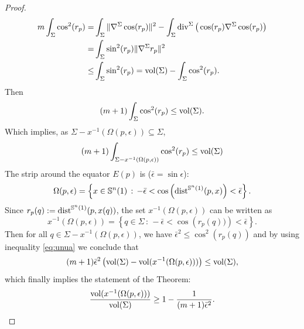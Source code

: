\documentclass{amsart}
\theoremstyle{definition}
\theoremstyle{remark}
\newcommand{\Div}{\operatorname{div}}
\begin{document}
\begin{proof}
\begin{equation}\label{eq:longa}
    \begin{aligned}
m\int_\Sigma\cos^2(r_p)=&\int_\Sigma\Vert \nabla^{\Sigma}  \cos(r_p)\Vert^2-\int_\Sigma \Div^\Sigma\big(\cos(r_p)\nabla^\Sigma \cos(r_p)\big)\\
=&\int_\Sigma \sin^2(r_p)\Vert \nabla^{\Sigma} r_p\Vert^2\\\leq& \int_\Sigma \sin^2(r_p)
={\rm vol}(\Sigma)- \int_\Sigma \cos^2(r_p).
\end{aligned}
\end{equation}
Then
\begin{equation}\label{eq:nula}
(m+1)\int_\Sigma \cos^2(r_p)\leq {\rm vol}(\Sigma).    
\end{equation}
Which implies, as  $\Sigma-x^{-1}(\Omega(p,\epsilon)) \subseteq \Sigma$,
\begin{equation}\label{eq:unua}
(m+1)\int_{\Sigma-x^{-1}(\Omega(p,\epsilon))} \cos^2(r_p)\leq {\rm vol}(\Sigma)    
\end{equation}
The strip around the equator $E(p)$ is ($\bar \epsilon=\sin \epsilon$):
$$
\Omega(p,\epsilon) =\left\lbrace x\in \mathbb{S}^{n}(1)\, : \, -\bar \epsilon<\cos\left({\rm dist}^{\mathbb{S}^{n}(1)}(p,x)\right)<\bar \epsilon\right\rbrace.
$$
Since $r_p(q):={\rm dist}^{\mathbb{S}^{n}(1)}(p,x(q))$, the set $x^{-1}(\Omega(p,\epsilon))$ can be written as 
$$
x^{-1}(\Omega(p,\epsilon))=\left\lbrace q \in \Sigma\,:\, -\bar \epsilon<\cos\left(r_p(q))\right)<\bar \epsilon\right\rbrace.
$$ Then for all $q \in\Sigma-x^{-1}(\Omega(p,\epsilon))$, we have
$ \bar\epsilon^2 \leq \cos^2(r_p(q))$  and by using inequality \eqref{eq:unua} we conclude that
 $$
(m+1)\bar \epsilon^2\left({\rm vol}(\Sigma)-{\rm vol}(x^{-1}(\Omega(p,\epsilon)))\right)\leq {\rm vol}(\Sigma),
$$ which finally implies the statement of the Theorem:
$$
\frac{{\rm vol}(x^{-1}(\Omega(p,\epsilon)))}{{\rm vol}(\Sigma)}\geq 1-\frac{1}{(m+1)\bar\epsilon^2}.
$$\end{proof}
\end{document}
